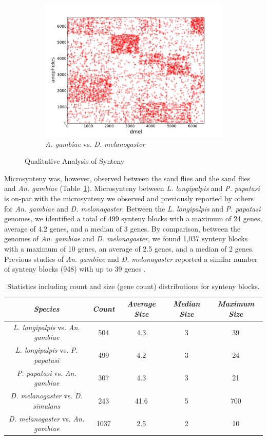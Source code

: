 \begin{figure}[H]
\begin{subfigure}[b]{0.45\textwidth}
    \includegraphics[width=\textwidth]{figures/synteny/dmel_anopheles_plot}
    \caption{\emph{A. gambiae} vs. \emph{D. melanogaster}}
    \label{fig:synteny-dotplots-anopheles-drosophila}
  \end{subfigure}
\label{fig:dot-plots}
\caption{Qualitative Analysis of Synteny}
\end{figure}

Microsynteny was, however, observed between the sand flies and the sand flies and \emph{An. gambiae} (Table~\ref{tab:synteny-block-stats}). Microsynteny between \emph{L. longipalpis} and \emph{P. papatasi} is on-par with the microsynteny we observed and previously reported by others for \emph{An. gambiae} and \emph{D. melonagaster}.  Between the \emph{L. longipalpis} and \emph{P. papatasi} genomes, we identified a total of 499 synteny blocks with a maximum of 24 genes, average of 4.2 genes, and a median of 3 genes. By comparison, between the genomes of \emph{An. gambiae} and \emph{D. melonagaster}, we found 1,037 synteny blocks with a maximum of 10 genes, an average of 2.5 genes, and a median of 2 genes. Previous studies of \emph{An. gambiae} and \emph{D. melonagaster} reported a similar number of synteny blocks (948) with up to 39 genes \cite{Zdobnov2002}.

\begin{table}[H]
  \centering
  \begin{tabular}{c c c c c} \hline
    \emph{Species} & \emph{Count} & \emph{Average Size} & \emph{Median Size} & \emph{Maximum Size} \\ \hline
    \emph{L. longipalpis} vs. \emph{An. gambiae} & 504 & 4.3 & 3 & 39 \\
    \emph{L. longipalpis} vs. \emph{P. papatasi} & 499 & 4.2 & 3 & 24 \\
    \emph{P. papatasi} vs. \emph{An. gambiae} & 307 & 4.3 & 3 & 21 \\
    \emph{D. melanogaster} vs. \emph{D. simulans} & 243 & 41.6 & 5 & 700 \\
    \emph{D. melanogaster} vs. \emph{An. gambiae} & 1037 & 2.5 & 2 & 10
  \end{tabular}
  \caption{Statistics including count and size (gene count) distributions for synteny blocks.}
  \label{tab:synteny-block-stats}
\end{table}

